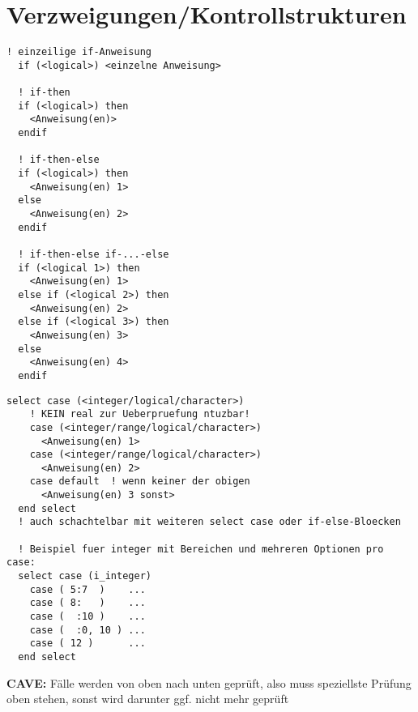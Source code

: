 \documentclass[a4paper, twocolumn]{scrarticle}
\begin{document}
\section{Verzweigungen/Kontrollstrukturen}
\begin{lstlisting}[caption={\bfseries Verzweigungen mit if}]
  ! einzeilige if-Anweisung
  if (<logical>) <einzelne Anweisung>
 
  ! if-then
  if (<logical>) then
    <Anweisung(en)>
  endif
  
  ! if-then-else
  if (<logical>) then
    <Anweisung(en) 1>
  else
    <Anweisung(en) 2>
  endif
  
  ! if-then-else if-...-else
  if (<logical 1>) then
    <Anweisung(en) 1>
  else if (<logical 2>) then
    <Anweisung(en) 2>
  else if (<logical 3>) then
    <Anweisung(en) 3>
  else
    <Anweisung(en) 4>
  endif
\end{lstlisting}
\begin{lstlisting}[caption={\bfseries Verzweigungen mit select case (um weit verzweigte if-else-Strukturen zu vermeiden)}]
  select case (<integer/logical/character>)
    ! KEIN real zur Ueberpruefung ntuzbar!
    case (<integer/range/logical/character>)
	  <Anweisung(en) 1>
	case (<integer/range/logical/character>)
	  <Anweisung(en) 2>
	case default  ! wenn keiner der obigen
	  <Anweisung(en) 3 sonst>
  end select
  ! auch schachtelbar mit weiteren select case oder if-else-Bloecken
	
  ! Beispiel fuer integer mit Bereichen und mehreren Optionen pro case:
  select case (i_integer)
	case ( 5:7  )    ...
	case ( 8:   )    ...
	case (  :10 )    ...
	case (  :0, 10 ) ...		
	case ( 12 )      ...
  end select
\end{lstlisting}
\textbf{CAVE:} Fälle werden von oben nach unten geprüft, also muss speziellste Prüfung oben stehen, sonst wird darunter ggf. nicht mehr geprüft
\end{document}

